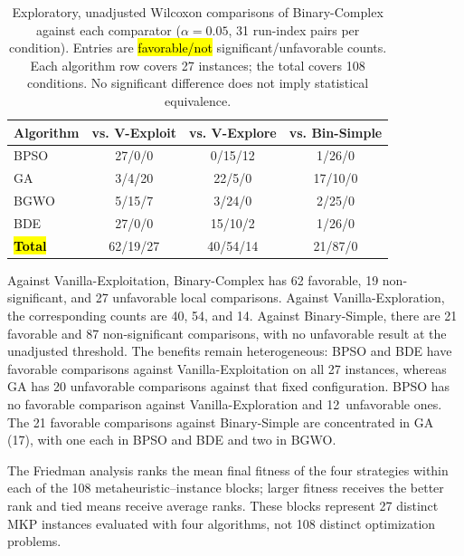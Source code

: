 \documentclass[mathematics,article,accept,moreauthors]{Definitions/mdpi}
\begin{document}
\begin{table}[H]
  \small
  \caption{Exploratory, unadjusted Wilcoxon comparisons of Binary-Complex
  against each comparator ($\alpha=0.05$, 31 run-index pairs per condition).
  Entries are \hl{favorable/not} %
 significant/unfavorable counts.
  Each algorithm row covers 27 instances; the total covers 108 conditions.
  No significant difference does not imply statistical equivalence.}
  \label{tab:wilcoxon_tests}
  \begin{tabularx}{\textwidth}{LCCC}
    \toprule
    \textbf{Algorithm} & \textbf{vs. V-Exploit} & \textbf{vs. V-Explore} & \textbf{vs. Bin-Simple} \\
    \midrule
    BPSO & 27/0/0 & 0/15/12 & 1/26/0 \\
    GA & 3/4/20 & 22/5/0 & 17/10/0 \\
    BGWO & 5/15/7 & 3/24/0 & 2/25/0 \\
    BDE & 27/0/0 & 15/10/2 & 1/26/0 \\
    \textbf{\hl{Total}} & 62/19/27 & 40/54/14 & 21/87/0 \\
    \bottomrule
  \end{tabularx}
\end{table}

Against Vanilla-Exploitation, Binary-Complex has 62 favorable, 19
non-significant, and 27 unfavorable local comparisons. Against
Vanilla-Exploration, the corresponding counts are 40, 54, and 14.
Against Binary-Simple, there are 21 favorable and 87 non-significant
comparisons, with no unfavorable result at the unadjusted threshold.
The benefits remain heterogeneous: BPSO and BDE have favorable comparisons
against Vanilla-Exploitation on all 27 instances, whereas GA has 20
unfavorable comparisons against that fixed configuration. BPSO has no
favorable comparison against Vanilla-Exploration and 12~unfavorable ones.
The 21 favorable comparisons against Binary-Simple are concentrated in
GA (17), with one each in BPSO and BDE and two in BGWO.

The Friedman analysis ranks the mean final fitness of the four strategies
within each of the 108 metaheuristic--instance blocks; larger fitness
receives the better rank and tied means receive average ranks.
These blocks represent 27 distinct MKP instances evaluated with four
algorithms, not 108 distinct optimization problems.
\end{document}
